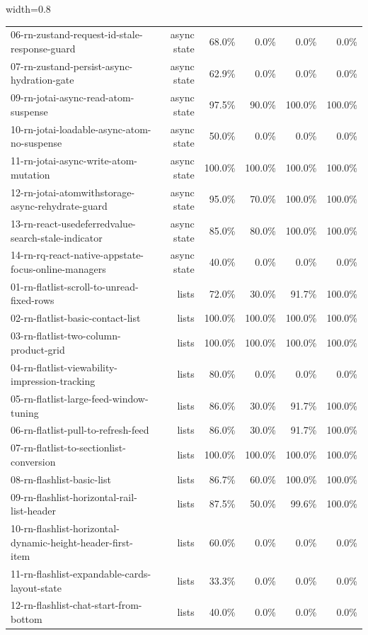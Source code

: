 \begin{table}[htbp]
\begin{adjustbox}{width=0.8\textwidth}
\begin{tabular}{lrrrrr}
06-rn-zustand-request-id-stale-response-guard & async state & 68.0\% & 0.0\% & 0.0\% & 0.0\% \\
07-rn-zustand-persist-async-hydration-gate & async state & 62.9\% & 0.0\% & 0.0\% & 0.0\% \\
09-rn-jotai-async-read-atom-suspense & async state & 97.5\% & 90.0\% & 100.0\% & 100.0\% \\
10-rn-jotai-loadable-async-atom-no-suspense & async state & 50.0\% & 0.0\% & 0.0\% & 0.0\% \\
11-rn-jotai-async-write-atom-mutation & async state & 100.0\% & 100.0\% & 100.0\% & 100.0\% \\
12-rn-jotai-atomwithstorage-async-rehydrate-guard & async state & 95.0\% & 70.0\% & 100.0\% & 100.0\% \\
13-rn-react-usedeferredvalue-search-stale-indicator & async state & 85.0\% & 80.0\% & 100.0\% & 100.0\% \\
14-rn-rq-react-native-appstate-focus-online-managers & async state & 40.0\% & 0.0\% & 0.0\% & 0.0\% \\
01-rn-flatlist-scroll-to-unread-fixed-rows & lists & 72.0\% & 30.0\% & 91.7\% & 100.0\% \\
02-rn-flatlist-basic-contact-list & lists & 100.0\% & 100.0\% & 100.0\% & 100.0\% \\
03-rn-flatlist-two-column-product-grid & lists & 100.0\% & 100.0\% & 100.0\% & 100.0\% \\
04-rn-flatlist-viewability-impression-tracking & lists & 80.0\% & 0.0\% & 0.0\% & 0.0\% \\
05-rn-flatlist-large-feed-window-tuning & lists & 86.0\% & 30.0\% & 91.7\% & 100.0\% \\
06-rn-flatlist-pull-to-refresh-feed & lists & 86.0\% & 30.0\% & 91.7\% & 100.0\% \\
07-rn-flatlist-to-sectionlist-conversion & lists & 100.0\% & 100.0\% & 100.0\% & 100.0\% \\
08-rn-flashlist-basic-list & lists & 86.7\% & 60.0\% & 100.0\% & 100.0\% \\
09-rn-flashlist-horizontal-rail-list-header & lists & 87.5\% & 50.0\% & 99.6\% & 100.0\% \\
10-rn-flashlist-horizontal-dynamic-height-header-first-item & lists & 60.0\% & 0.0\% & 0.0\% & 0.0\% \\
11-rn-flashlist-expandable-cards-layout-state & lists & 33.3\% & 0.0\% & 0.0\% & 0.0\% \\
12-rn-flashlist-chat-start-from-bottom & lists & 40.0\% & 0.0\% & 0.0\% & 0.0\% \\

\end{tabular}
\end{adjustbox}
\end{table}
